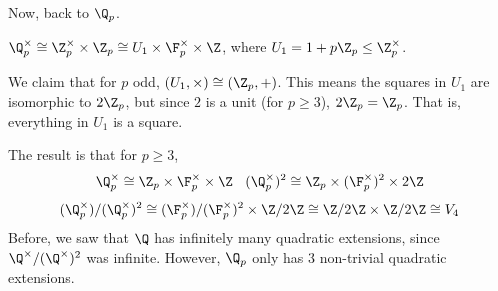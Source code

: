 Now, back to $\Q_p$.

\begin{notebox*}[Recall]
    $\Q_p^\times \cong \Z_p^\times \times \Z_p \cong U_1 \times \F_p^\times \times \Z$, where $U_1 = 1+p\Z_p \leq \Z_p^\times$.
\end{notebox*}

\begin{notebox*}[Claim]
    We claim that for $p$ odd, $(U_1,\times) \cong (\Z_p,+)$. This means the squares in $U_1$ are isomorphic to $2\Z_p$, but since $2$ is a unit (for $p\geq3$), $2\Z_p=\Z_p$. That is, everything in $U_1$ is a square.

    The result is that for $p\geq3$,
    $$\Q_p^\times \cong \Z_p \times \F_p^\times \times \Z \:\:\:\: (\Q_p^\times)^2 \cong \Z_p \times (\F_p^\times)^2 \times 2\Z$$
    $$(\Q_p^\times)/(\Q_p^\times)^2 \cong (\F_p^\times)/(\F_p^\times)^2 \times \Z/2\Z \cong \Z/2\Z \times \Z/ 2\Z \cong V_4$$
    Before, we saw that $\Q$ has infinitely many quadratic extensions, since $\Q^\times/(\Q^\times)^2$ was infinite. However, $\Q_p$ only has $3$ non-trivial quadratic extensions.
\end{notebox*}

